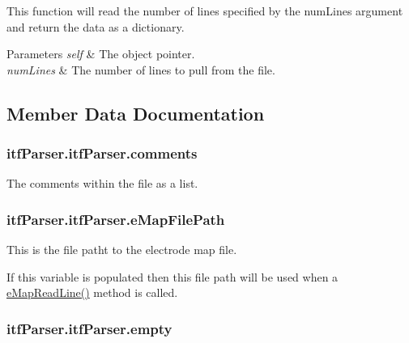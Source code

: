 This function will read the number of lines specified by the num\-Lines argument and return the data as a dictionary. 


\begin{DoxyParams}{Parameters}
{\em self} & The object pointer. \\
\hline
{\em num\-Lines} & The number of lines to pull from the file. \\
\hline
\end{DoxyParams}


\subsection{Member Data Documentation}
\hypertarget{classitf_parser_1_1itf_parser_ab7f889a0dc7be9cbecf57d072a9daf46}{
\subsubsection[{comments}]{\setlength{\rightskip}{0pt plus 5cm}itf\-Parser.\-itf\-Parser.\-comments}}\label{classitf_parser_1_1itf_parser_ab7f889a0dc7be9cbecf57d072a9daf46}


The comments within the file as a list. 

\hypertarget{classitf_parser_1_1itf_parser_a48bb3ccf340622586bc45a2c003df40a}{
\subsubsection[{e\-Map\-File\-Path}]{\setlength{\rightskip}{0pt plus 5cm}itf\-Parser.\-itf\-Parser.\-e\-Map\-File\-Path}}\label{classitf_parser_1_1itf_parser_a48bb3ccf340622586bc45a2c003df40a}


This is the file patht to the electrode map file. 

If this variable is populated then this file path will be used when a \hyperlink{classitf_parser_1_1itf_parser_a88b52051bda28ba4aa6d01e67df4eff8}{e\-Map\-Read\-Line()} method is called. \hypertarget{classitf_parser_1_1itf_parser_a1a239520970f218dc3731c17ebed8815}{
\subsubsection[{empty}]{\setlength{\rightskip}{0pt plus 5cm}itf\-Parser.\-itf\-Parser.\-empty}}\label{classitf_parser_1_1itf_parser_a1a239520970f218dc3731c17ebed8815}


